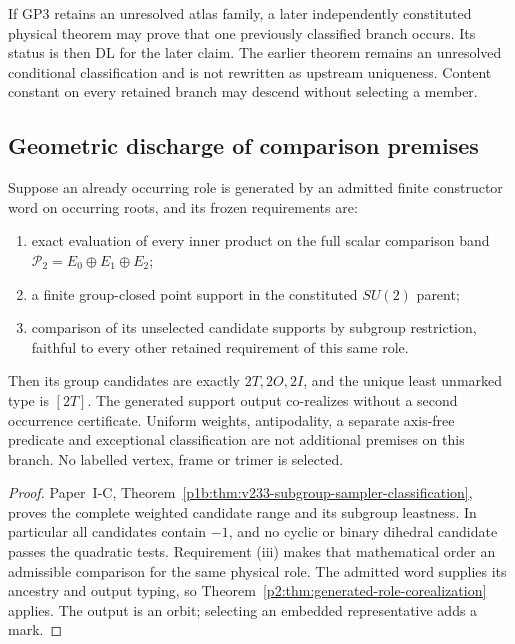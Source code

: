 \documentclass[12pt,a4paper]{article}
\begin{document}
\begin{remark}
\label{p2a:rem:v236-prospective-discharge}
If GP3 retains an unresolved atlas family, a later independently constituted
physical theorem may prove that one previously classified branch occurs.  Its
status is then \(\mathrm{DL}\) for the later claim.  The earlier theorem
remains an unresolved conditional classification and is not rewritten as
upstream uniqueness.  Content constant on every retained branch may descend
without selecting a member.
\end{remark}



\subsection{Geometric discharge of comparison premises}
\label{p2a:sec:v233-premise-closure}

\begin{theorem}
\label{p2a:thm:v233-quadratic-support-discharge}
Suppose an already occurring role is generated by an admitted finite
constructor word on occurring roots, and its frozen requirements are:
\begin{enumerate}[label=(\roman*),leftmargin=2em]
\item exact evaluation of every inner product on the full scalar
comparison band \(\mathcal P_2=E_0\oplus E_1\oplus E_2\);
\item a finite group-closed point support in the constituted \(SU(2)\)
parent;
\item comparison of its unselected candidate supports by subgroup
restriction, faithful to every other retained requirement of this
same role.
\end{enumerate}
Then its group candidates are exactly \(2T,2O,2I\), and the unique
least unmarked type is \([2T]\). The generated support output
co-realizes without a second occurrence certificate.
Uniform weights, antipodality, a separate axis-free predicate and
exceptional classification are not additional premises on this branch.
No labelled vertex, frame or trimer is selected.
\end{theorem}
\begin{proof}
Paper~I-C, Theorem~\ref{p1b:thm:v233-subgroup-sampler-classification},
proves the complete weighted candidate range and its subgroup leastness.
In particular all candidates contain \(-1\), and no cyclic or binary
dihedral candidate passes the quadratic tests. Requirement (iii)
makes that mathematical order an admissible comparison for the same
physical role. The admitted word supplies its ancestry and output
typing, so Theorem~\ref{p2:thm:generated-role-corealization} applies.
The output is an orbit; selecting an embedded representative adds a mark.
\end{proof}
\end{document}
